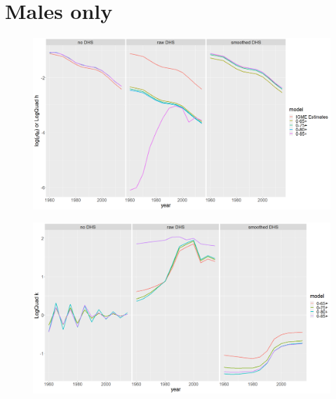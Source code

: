\documentclass[12pt,a4paper]{article}
\begin{document}
\section*{\centering Males only}
\begin{figure}[H]
\includegraphics[width = \linewidth]{Burkina Faso/7/male h.png}
\end{figure}
\begin{figure}[H]
\includegraphics[width = \linewidth]{Burkina Faso/7/male k.png}
\end{figure}

\newpage
\end{document}
